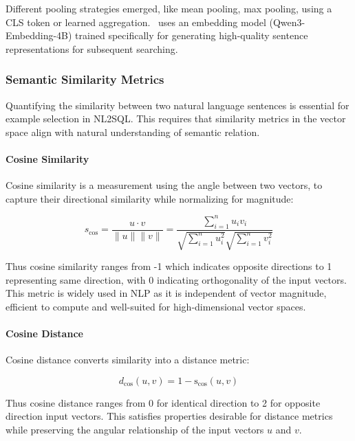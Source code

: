 Different pooling strategies emerged, like mean pooling, max pooling, using a
CLS token or learned aggregation. \Natural~uses an embedding model
(Qwen3-Embedding-4B) trained specifically for generating high-quality sentence
representations for subsequent searching.

\subsubsection{Semantic Similarity Metrics}

Quantifying the similarity between two natural language sentences is essential
for example selection in NL2SQL. This requires that similarity metrics in the
vector space align with natural understanding of semantic relation.

\paragraph{Cosine Similarity}

Cosine similarity is a measurement using the angle between two vectors,
to capture their directional similarity while normalizing for magnitude:

\begin{equation}
s_{\cos} = \frac{u \cdot v}{\|u\| \|v\|} = \frac{\displaystyle\sum_{i=1}^n u_i v_i}{\sqrt{\displaystyle\sum_{i=1}^n u_i^2} \sqrt{\displaystyle\sum_{i=1}^n v_i^2}}
\end{equation}

Thus cosine similarity ranges from -1 which indicates opposite directions to 1
representing same direction, with 0 indicating orthogonality of the input
vectors. This metric is widely used in NLP as it is independent of vector
magnitude, efficient to compute and well-suited for high-dimensional vector
spaces. 

\paragraph{Cosine Distance}

Cosine distance converts similarity into a distance metric:

\begin{equation}
d_{\cos}(u, v) = 1 - \text{s}_{\cos}(u, v)
\end{equation}

Thus cosine distance ranges from 0 for identical direction to 2 for opposite
direction input vectors. This satisfies properties desirable for distance
metrics while preserving the angular relationship of the input vectors $u$ and
$v$.
